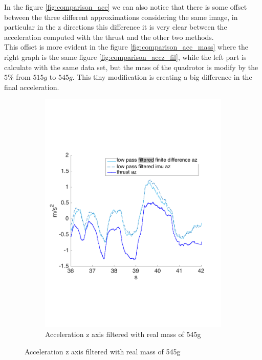 In the figure \ref{fig:comparison_acc} we can also notice that there is some offset between the three different approximations considering the same image, in particular in the z directions this difference it is very clear between the acceleration computed with the thrust and the other two methods.\\
This offset is more evident in the figure \ref{fig:comparison_acc_mass} where the right graph is the same figure \ref{fig:comparison_accz_fil}, while the left part is calculate with the same data set, but the mass of the quadrotor is modify by the $5\%$ from $515g$ to $545g$. This tiny modification is creating a big difference in the final acceleration.

\begin{figure}[!htbp]
 \centering   
  \begin{subfigure}[b]{0.45\textwidth}
     \includegraphics[width=\textwidth]{img/acceleration_mass_correct_filtered_z.pdf}
        \caption{Acceleration z axis filtered with real mass of 545g}
        \label{fig:comparison_accz_mass}

\end{subfigure}
\end{figure}
